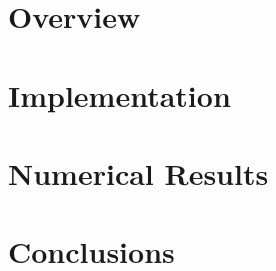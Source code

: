 
\maketitle





\newpage
\tableofcontents


\newpage
\section{Overview}


\newpage
\section{Implementation}


\newpage
\section{Numerical Results}


\newpage
\section{Conclusions}



\newpage
{}

\printbibliography